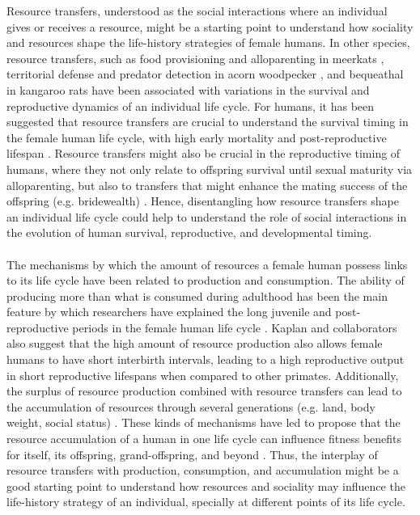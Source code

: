 \documentclass{article}
\begin{document}
Resource transfers, understood as the social interactions where an individual gives or receives a resource, might be a starting point to understand how sociality and resources shape the life-history strategies of female humans. In other species, resource transfers, such as food provisioning and alloparenting in meerkats \citep{clutton2016meerkats}, territorial defense and predator detection in acorn woodpecker \citep{koenig2019does}, and bequeathal in kangaroo rats \citep{jones1986survivorship} have been associated with variations in the survival and reproductive dynamics of an individual life cycle. For humans, it has been suggested that resource transfers are crucial to understand the survival timing in the female human life cycle, with high early mortality and post-reproductive lifespan \citep{lee2003rethinking,lee2008sociality,chu2006co}. Resource transfers might also be crucial in the reproductive timing of humans, where they not only relate to offspring survival until sexual maturity via alloparenting, but also to transfers that might enhance the mating success of the offspring (e.g. bridewealth) \citep{jones2015resource}. Hence, disentangling how resource transfers shape an individual life cycle could help to understand the role of social interactions in the evolution of human survival, reproductive, and developmental timing.
\\\\
The mechanisms by which the amount of resources a female human possess links to its life cycle have been related to production and consumption. The ability of producing more than what is consumed during adulthood has been the main feature by which researchers have explained the long juvenile and post-reproductive periods in the female human life cycle \citep{kaplan2000theory}. Kaplan and collaborators also suggest that the high amount of resource production also allows female humans to have short interbirth intervals, leading to a high reproductive output in short reproductive lifespans when compared to other primates. Additionally, the surplus of resource production combined with resource transfers can lead to the accumulation of resources through several generations (e.g. land, body weight, social status) \citep{mulder2009intergenerational}. These kinds of mechanisms have led to propose that the resource accumulation of a human in one life cycle can influence fitness benefits for itself, its offspring, grand-offspring, and beyond \citep{rogers1990evolutionary,boone1999more,goodman2012low}. Thus, the interplay of resource transfers with production, consumption, and accumulation might be a good starting point to understand how resources and sociality may influence the life-history strategy of an individual, specially at different points of its life cycle.
\end{document}
